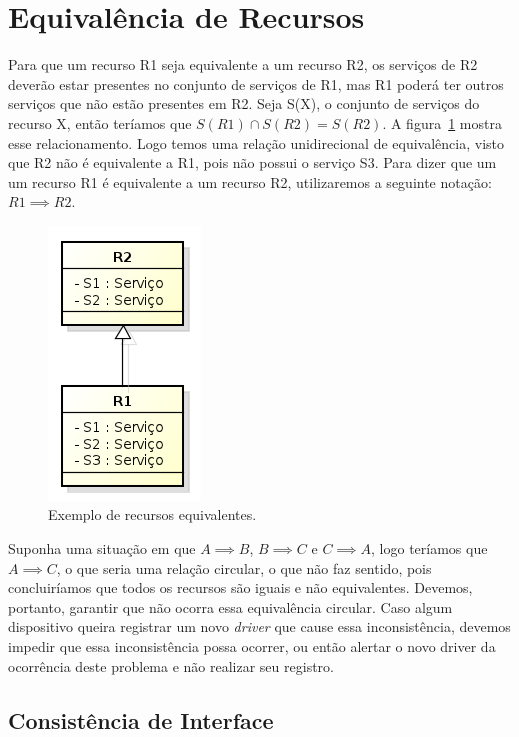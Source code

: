 \section{Equivalência de Recursos}

	Para que um recurso R1 seja equivalente a um recurso R2, os serviços de R2 deverão estar presentes no conjunto de serviços de R1, mas R1 poderá ter outros serviços que não estão presentes em R2. Seja S(X), o conjunto de serviços do recurso X, então teríamos que $S(R1) \cap S(R2) = S(R2)$. 
	A figura~\ref{fig:equivalenciaDeRecursos} mostra esse relacionamento.
	Logo temos uma relação unidirecional de equivalência, visto que R2 não é equivalente a R1, pois não possui o serviço S3. Para dizer que um um recurso R1 é equivalente a um recurso R2, utilizaremos a seguinte notação: $R1 \implies R2$.
	
	\begin{figure}[ht]
		\center
		\includegraphics[scale=0.6]{imagens/equivalenciaDeRecursos}
		\caption{Exemplo de recursos equivalentes.}
		\label{fig:equivalenciaDeRecursos}
	\end{figure}

	Suponha uma situação em que $A \implies B$, $B \implies C$ e $C \implies A$, logo teríamos que $A \implies C$, o que seria uma relação circular, o que não faz sentido, pois concluiríamos que todos os recursos são iguais e não equivalentes. Devemos, portanto, garantir que não ocorra essa equivalência circular. Caso algum dispositivo queira registrar um novo \emph{driver} que cause essa inconsistência, devemos impedir que essa inconsistência possa ocorrer, ou então alertar o novo driver da ocorrência deste problema e não realizar seu registro. 

\subsection{Consistência de Interface}

